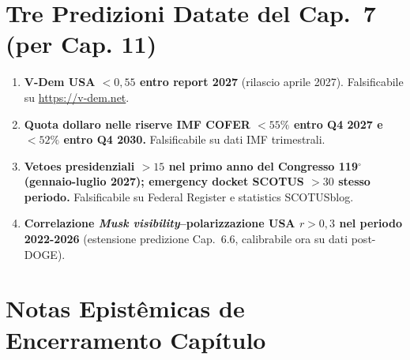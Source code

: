 \section{Tre Predizioni Datate del Cap.~7 (per Cap.
11)}\label{tre-predizioni-datate-del-cap.-7-per-cap.-11}

\begin{enumerate}
\def\labelenumi{\arabic{enumi}.}
\tightlist
\item
  \textbf{V-Dem USA \(< 0{,}55\) entro report 2027} (rilascio aprile
  2027). Falsificabile su \url{https://v-dem.net}.
\item
  \textbf{Quota dollaro nelle riserve IMF COFER \(< 55\%\) entro Q4 2027
  e \(< 52\%\) entro Q4 2030.} Falsificabile su dati IMF trimestrali.
\item
  \textbf{Vetoes presidenziali \(> 15\) nel primo anno del Congresso
  119$^\circ$ (gennaio-luglio 2027); emergency docket SCOTUS \(> 30\) stesso
  periodo.} Falsificabile su Federal Register e statistics SCOTUSblog.
\item
  \textbf{Correlazione \emph{Musk visibility}--polarizzazione USA
  \(r > 0{,}3\) nel periodo 2022-2026} (estensione predizione Cap.~6.6,
  calibrabile ora su dati post-DOGE).
\end{enumerate}



\section{Notas Epistêmicas de Encerramento
Capítulo}\label{note-epistemiche-di-chiusura-capítulo}


